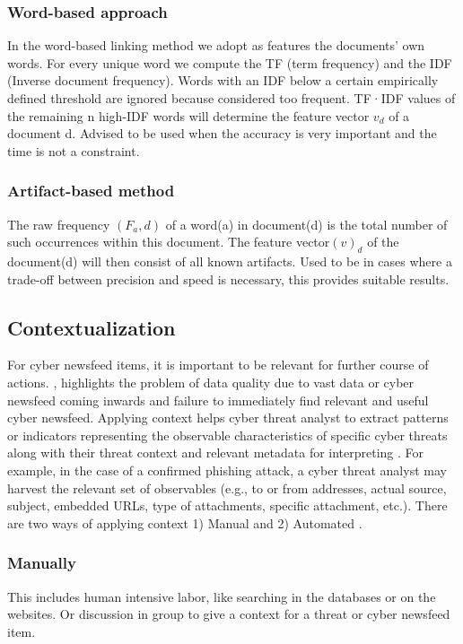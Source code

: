 \subsubsection{Word-based approach}
In the word-based linking method we adopt as features
the documents’ own words. 
For every unique word we compute the TF (term frequency) 
and the IDF (Inverse document frequency). 
Words with an IDF below a certain empirically defined threshold 
are ignored because considered too frequent. 
TF·IDF values of the remaining n high-IDF words will determine the feature vector $v_d$ of a document d.
Advised to be used when the accuracy 
is very important and the time is not a constraint.

\subsubsection{Artifact-based method}
The raw frequency $(F_a,d)$ of a word(a) in document(d) is the total number of such occurrences within this document. 
The feature vector$(v)_d$ of the document(d) will then consist of all known artifacts.
Used to be in cases where a trade-off between precision 
and speed is necessary, this provides suitable results.

\subsection{Contextualization}
For cyber newsfeed items, 
it is important to be relevant for further course of actions. 
\cite{sillaber2016data}, highlights the problem of data quality due to vast data or cyber newsfeed coming inwards and failure to immediately find relevant and useful cyber newsfeed. 
Applying context helps cyber threat analyst to extract patterns 
or indicators representing the observable characteristics 
of specific cyber threats along with their threat context 
and relevant metadata for interpreting 
\citep{barnum2012standardizing}. 
For example, in the case of a confirmed phishing attack, 
a cyber threat analyst may harvest the relevant set of observables
(e.g., to or from addresses, actual source, subject, embedded URLs, type of attachments, specific attachment, etc.).
There are two ways of applying context 1) Manual and 2) Automated 
\citep{barnum2012standardizing}.

\subsubsection{Manually}
This includes human intensive labor, like searching in the databases or on the websites. Or discussion in group to give a context for a threat or cyber newsfeed item.

